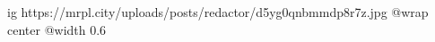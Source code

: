  
 
 
 
 

\ifcmt
  ig https://mrpl.city/uploads/posts/redactor/d5yg0qnbmmdp8r7z.jpg
  @wrap center
  @width 0.6
\fi
